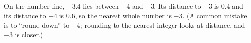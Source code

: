 On the number line, $-3.4$ lies between $-4$ and $-3$. Its distance to $-3$ is $0.4$ and its distance to $-4$ is $0.6$, so the nearest whole number is $\boxed{-3}$. (A common mistake is to ``round down'' to $-4$; rounding to the nearest integer looks at distance, and $-3$ is closer.)
